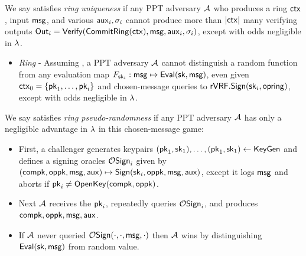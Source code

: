 \begin{definition}
We say \rVRF satisfies {\em ring uniqueness} if
any PPT adversary $\mathcal{A}$ who produces
 a ring $\mathsf{ctx}$, input $\mathsf{msg}$,  and various $\mathsf{aux}_i,\sigma_i$
cannot produce more than $|\mathsf{ctx}|$ many verifying outputs
${\mathsf{Out}}_i = {\mathsf{Verify}}({\mathsf{CommitRing}}(\mathsf{ctx}),\mathsf{msg},\mathsf{aux}_i,\sigma_i)$,
 except with odds negligible in $\lambda$.
\end{definition}



























\noindent 
\begin{itemize}

\item {\em Ring } - 
  Assuming ,
 a PPT adversary $\mathcal{A}$ cannot distinguish a random function from
  any evaluation map $F_{\mathsf{sk}_i} : \mathsf{msg} \mapsto {\ensuremath{\mathsf{Eval}}}(\mathsf{sk},\mathsf{msg})$,
 even given $\mathsf{ctx}_0 = \{ \mathsf{pk}_1,\ldots,\mathsf{pk}_i \}$ and
  chosen-message queries to ${\mathsf{rVRF}}.{\mathsf{Sign}}(\mathsf{sk}_i,\mathsf{opring})$,
  except with odds negligible in $\lambda$.
\end{itemize}


\begin{definition}
We say \rVRF satisfies {\em ring pseudo-randomness} if 
any PPT adversary $\mathcal{A}$ has only a negligible advantage in $\lambda$
in this chosen-message game:
\begin{itemize}
 \item First, a challenger
  generates keypairs $(\mathsf{pk}_1,\mathsf{sk}_1),\ldots,(\mathsf{pk}_1,\mathsf{sk}_1) \leftarrow {\ensuremath{\mathsf{KeyGen}}}$ and
  defines a signing oracles $\mathcal{O}\mathsf{Sign}_i$ given by
  $(\mathsf{compk},\mathsf{oppk},\mathsf{msg},\mathsf{aux}) \mapsto {\ensuremath{\mathsf{Sign}}}(\mathsf{sk}_i,\mathsf{oppk},\mathsf{msg},\mathsf{aux})$,
   except it logs $\mathsf{msg}$ and aborts if $\mathsf{pk}_i \ne {\ensuremath{\mathsf{OpenKey}}}(\mathsf{compk},\mathsf{oppk})$.
 \item Next $\mathcal{A}$ receives the $\mathsf{pk}_i$, repeatedly queries $\mathcal{O}\mathsf{Sign}_i $,
  and produces $\mathsf{compk},\mathsf{oppk},\mathsf{msg},\mathsf{aux}$. 
 \item If $\mathcal{A}$ never queried $\mathcal{O}\mathsf{Sign}(\cdot,\cdot,\mathsf{msg},\cdot)$ then
  $\mathcal{A}$ wins by distinguishing ${\mathsf{Eval}}(\mathsf{sk},\mathsf{msg})$ from random value.
\end{itemize}
\end{definition}


